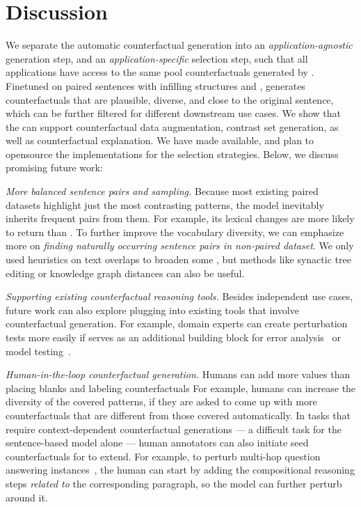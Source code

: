 \section{Discussion}
\label{sec:discuss}

We separate the automatic counterfactual generation into an \emph{application-agnostic} generation step, and an \emph{application-specific} selection step, such that all applications have access to the same pool counterfactuals generated by \sysname.
Finetuned on paired sentences with infilling structures and \tagstrs, \sysname generates counterfactuals that are plausible, diverse, and close to the original sentence, which can be further filtered for different downstream use cases. 
We show that the \sysname can support counterfactual data augmentation, contrast set generation, as well as counterfactual explanation.
We have made \sysname available, and plan to opensource the implementations for the selection strategies.
Below, we discuss promising future work:


\emph{More balanced sentence pairs and sampling.}
Because most existing paired datasets highlight just the most contrasting patterns, the \sysname model inevitably inherits frequent pairs from them.
For example, its lexical changes are more likely to return  than .
To further improve the vocabulary diversity, we can emphasize more on \emph{finding naturally occurring sentence pairs in non-paired dataset}. 
We only used heuristics on text overlaps to broaden some \tagstrs, but methods like synactic tree editing or knowledge graph distances can also be useful.

\emph{Supporting existing counterfactual reasoning tools.}
Besides independent use cases, future work can also explore plugging \sysname into existing tools that involve counterfactual generation.
For example, domain experts can create perturbation tests more easily if \sysname serves as an additional building block for error analysis~\cite{wu2019errudite} or model testing~\cite{checklist:acl20}.


\emph{Human-in-the-loop counterfactual generation.}
Humans can add more values than placing blanks and labeling counterfactuals
For example, humans can increase the diversity of the covered patterns, if they are asked to come up with more counterfactuals that are different from those covered automatically.
In tasks that require context-dependent counterfactual generations --- a difficult task for the sentence-based model alone --- human annotators can also initiate seed counterfactuals for \sysname to extend.
For example, to perturb multi-hop question answering instances~\cite{gardner2020contrast}, the human can start by adding the compositional reasoning steps \emph{related to} the corresponding paragraph, so the model can further perturb around it.